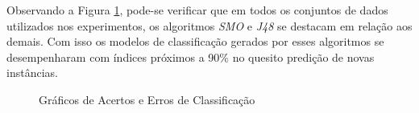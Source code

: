 \documentclass[
	12pt,				%
	openright,			%
	oneside,	
	a4paper,				%
	english,				%
	brazil				%
]{abntex2/abntex2} %
\begin{document}
	
	Observando a Figura \ref{figAcertosErrosClassificacao}, pode-se verificar que em todos os conjuntos de dados utilizados nos experimentos, os algoritmos \textit{SMO} e \textit{J48} se destacam em relação aos demais. Com isso os modelos de classificação gerados por esses algoritmos se desempenharam com índices próximos a 90\% no quesito predição de novas instâncias.
	
	\begin{figure}[!htb]
		\begin{center}
			\caption{\label{figAcertosErrosClassificacao} \fontsize{10}{\baselineskip} \selectfont Gráficos de Acertos e Erros de Classificação}
		\end{center}
\end{figure}
\end{document}
